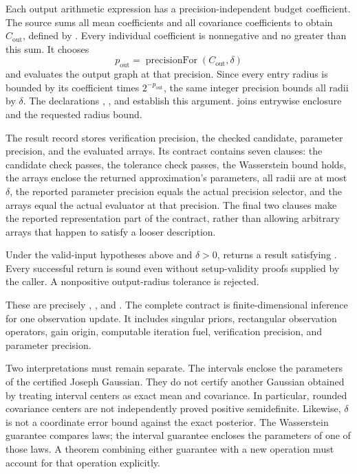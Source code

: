 Each output arithmetic expression has a precision-independent budget coefficient.
The source sums all mean coefficients and all covariance coefficients to obtain
$C_{\mathrm{out}}$, defined by . Every individual coefficient is
nonnegative and no greater than this sum. It chooses
\[
 p_{\mathrm{out}}=\operatorname{precisionFor}(C_{\mathrm{out}},\delta)
\]
and evaluates the output graph at that precision. Since every entry radius is
bounded by its coefficient times $2^{-p_{\mathrm{out}}}$, the same integer
precision bounds all radii by $\delta$. The declarations ,
, and  establish this argument.
 joins entrywise enclosure and the requested radius bound.

The result record stores verification precision, the checked candidate, parameter
precision, and the evaluated arrays. Its contract  contains
seven clauses: the candidate check passes, the tolerance check passes, the
Wasserstein bound holds, the arrays enclose the returned approximation's parameters,
all radii are at most $\delta$, the reported parameter precision equals the actual
precision selector, and the arrays equal the actual evaluator at that precision.
The final two clauses make the reported representation part of the contract,
rather than allowing arbitrary arrays that happen to satisfy a looser description.

\begin{theorem}
Under the valid-input hypotheses above and $\delta>0$,
 returns a result satisfying
. Every successful return is sound even without setup-validity
proofs supplied by the caller. A nonpositive output-radius tolerance is rejected.
\end{theorem}

These are precisely , , and
. The complete contract is
finite-dimensional inference for one observation update. It includes singular
priors, rectangular observation operators, gain origin, computable iteration fuel,
verification precision, and parameter precision.

Two interpretations must remain separate. The intervals enclose the parameters
of the certified Joseph Gaussian. They do not certify another Gaussian obtained
by treating interval centers as exact mean and covariance. In particular, rounded
covariance centers are not independently proved positive semidefinite. Likewise,
$\delta$ is not a coordinate error bound against the exact posterior. The
Wasserstein guarantee compares laws; the interval guarantee encloses the parameters
of one of those laws. A theorem combining either guarantee with a new operation
must account for that operation explicitly.


